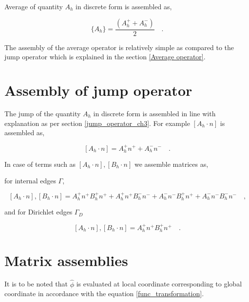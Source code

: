 \documentclass[a4paper,openany]{book}
\begin{document}
Average of quantity $A_h$ in discrete form is assembled as,

\begin{equation}\label{Average operator}
\lbrace A_h \rbrace = \frac{(A_h^+ + A_h^-)}{2} \quad \textrm{.}
\end{equation}

The assembly of the average operator is relatively simple as compared to the jump operator which is explained in the section \ref{Average operator}.

\section{Assembly of jump operator} \label{Jump operator}

The jump of the quantity $A_h$ in discrete form is assembled in line with explanation as per section \ref{jump_operator_ch3}. For example $[A_h \cdot n]$ is assembled as,

\begin{equation} \label{Jump_operator}
[A_h \cdot n] = A_h^+ n^+ + A_h^- n^- \quad \textrm{.}
\end{equation}

In case of terms such as $[A_h \cdot n],[B_h \cdot n]$ we assemble matrices as, 

for internal edges $\Gamma$,

\begin{equation} \label{Jump operator L2}
[A_h \cdot n],[B_h \cdot n] = A_h^+ n^+ B_h^+ n^+ + A_h^+ n^+ B_h^- n^- + A_h^- n^- B_h^+ n^+ + A_h^- n^- B_h^- n^- \quad \textrm{,}
\end{equation}

and for Dirichlet edges $\Gamma_D$

\begin{equation} \label{Jump operator L2 for dirichlet}
[A_h \cdot n],[B_h \cdot n] = A_h^+ n^+ B_h^+ n^+ \quad \textrm{.}
\end{equation}


\section{Matrix assemblies} \label{matrix_assembly_ch4}

It is to be noted that $\hat{\phi}$ is evaluated at local coordinate corresponding to global coordinate in accordance with the equation \eqref{func_transformation}.
\end{document}
